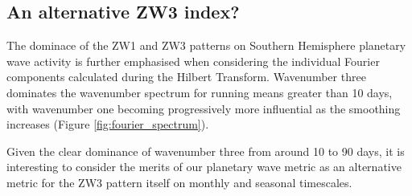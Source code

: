 \subsection{An alternative ZW3 index?}

The dominace of the ZW1 and ZW3 patterns on Southern Hemisphere planetary wave activity is further emphasised when considering the individual Fourier components calculated during the Hilbert Transform. Wavenumber three dominates the wavenumber spectrum for running means greater than 10 days, with wavenumber one becoming progressively more influential as the smoothing increases (Figure \ref{fig:fourier_spectrum}).

Given the clear dominance of wavenumber three from around 10 to 90 days, it is interesting to consider the merits of our planetary wave metric as an alternative metric for the ZW3 pattern itself on monthly and seasonal timescales.  


